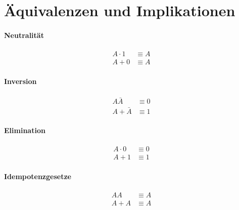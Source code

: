 \documentclass[../main.tex]{subfiles}
\begin{document}
    \section{Äquivalenzen und Implikationen}
        \label{section:DiskreteMathematik:BoolescheAlgebra:Implikationen}
        \paragraph{Neutralität}
            \begin{subequations}
                \begin{align}
                    A \cdot 1 &\equiv A\\
                    A + 0 &\equiv A
                \end{align}
            \end{subequations}
        
        \paragraph{Inversion}
            \begin{subequations}
                \begin{align}
                    A\bar{A} &\equiv 0\\
                    A + \bar{A} &\equiv 1
                \end{align}
            \end{subequations}
        
        \paragraph{Elimination}
            \begin{subequations}
                \begin{align}
                    A \cdot 0 &\equiv 0\\
                    A + 1 &\equiv 1
                \end{align}
            \end{subequations}
        
        \paragraph{Idempotenzgesetze}
            \begin{subequations}
                \begin{align}
                    AA &\equiv A\\
                    A + A &\equiv A
                \end{align}
            \end{subequations}
        
\end{document}
